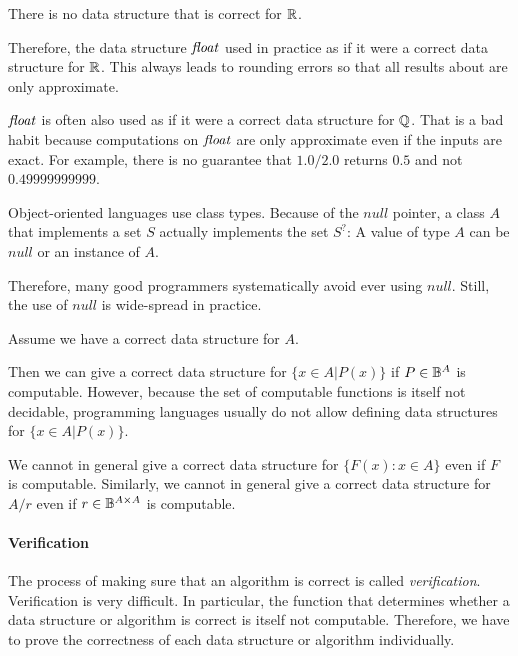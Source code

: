 \begin{example}
There is no data structure that is correct for $\mathbb{R}$.

Therefore, the data structure $\mathit{float}$ used in practice as if it were a correct data structure for $\mathbb{R}$.
This always leads to rounding errors so that all results about are only approximate.

$\mathit{float}$ is often also used as if it were a correct data structure for $\mathbb{Q}$.
That is a bad habit because computations on $\mathit{float}$ are only approximate even if the inputs are exact.
For example, there is no guarantee that $1.0/2.0$ returns $0.5$ and not $0.49999999999$.
\end{example}

\begin{example}
Object-oriented languages use class types.
Because of the $null$ pointer, a class $A$ that implements a set $S$ actually implements the set $S^?$: A value of type $A$ can be $null$ or an instance of $A$.

Therefore, many good programmers systematically avoid ever using $null$.
Still, the use of $null$ is wide-spread in practice.
\end{example}

\begin{example}
Assume we have a correct data structure for $A$.
\medskip

Then we can give a correct data structure for $\{x\in A|P(x)\}$ if $P\in\mathbb{B}^A$ is computable.
However, because the set of computable functions is itself not decidable, programming languages usually do not allow defining data structures for $\{x\in A|P(x)\}$.
\medskip

We cannot in general give a correct data structure for $\{F(x):x\in A\}$ even if $F$ is computable.
Similarly, we cannot in general give a correct data structure for $A/r$ even if $r\in \mathbb{B}^{A\times A}$ is computable.
\end{example}

\paragraph{Verification}
The process of making sure that an algorithm is correct is called \emph{verification}.
Verification is very difficult.
In particular, the function that determines whether a data structure or algorithm is correct is itself not computable.
Therefore, we have to prove the correctness of each data structure or algorithm individually.

